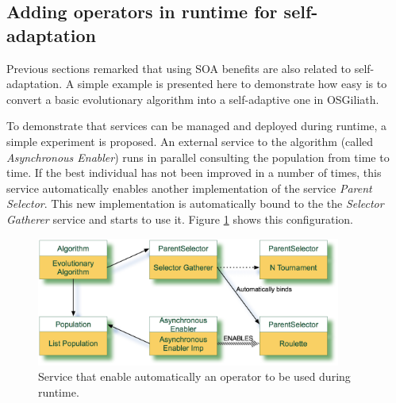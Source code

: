 \subsection{Adding operators in runtime for self-adaptation} %

Previous sections remarked that using SOA benefits are also related
to self-adaptation. A simple example is presented here to demonstrate
how easy is to convert a basic evolutionary algorithm into a
self-adaptive one in OSGiliath. 



To demonstrate that services can be managed and deployed during runtime, a simple experiment is proposed. An external service to the algorithm (called {\em Asynchronous Enabler}) runs in parallel consulting the population from time to time. If the best individual has not been improved in a number of times, this  service automatically enables another implementation of the service {\em Parent Selector}. This new implementation is automatically bound to the the {\em Selector Gatherer} service and starts to use it. Figure \ref{fig:osgiliath:enabler} shows this configuration.

\begin{figure}
\centering
\includegraphics[width=10cm]{gfx/osgiliath/enabler.jpg}
\caption{Service that enable automatically an operator to be used during runtime.}
\label{fig:osgiliath:enabler}
\end{figure}

